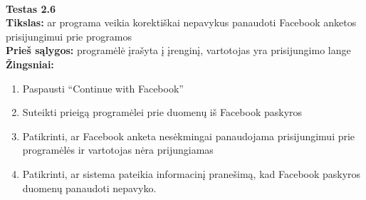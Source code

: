 \documentclass{VUMIFPSkursinis}
\begin{document}
		\textbf{}\\
		\textbf{Testas 2.6}\\
		\textbf{Tikslas:} ar programa veikia korektiškai nepavykus panaudoti Facebook anketos prisijungimui prie programos\\
		\textbf{Prieš sąlygos:} programėlė įrašyta į įrenginį, vartotojas yra prisijungimo lange\\
		\textbf{Žingsniai:}
		\begin{enumerate}[noitemsep,topsep=0pt]
			\item Paspausti “Continue with Facebook”
			\item Suteikti prieigą programėlei prie duomenų iš Facebook paskyros
			\item Patikrinti, ar Facebook anketa nesėkmingai panaudojama prisijungimui prie programėlės ir vartotojas nėra prijungiamas
			\item Patikrinti, ar sistema pateikia informacinį pranešimą, kad Facebook paskyros duomenų panaudoti nepavyko.
		\end{enumerate}
\end{document}
